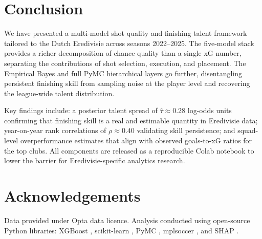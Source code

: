 \documentclass[12pt,a4paper]{article}
\begin{document}
\section{Conclusion}
\label{sec:conclusion}

We have presented a multi-model shot quality and finishing talent framework tailored to the Dutch Eredivisie across seasons 2022--2025. The five-model stack provides a richer decomposition of chance quality than a single xG number, separating the contributions of shot selection, execution, and placement. The Empirical Bayes and full PyMC hierarchical layers go further, disentangling persistent finishing skill from sampling noise at the player level and recovering the league-wide talent distribution.

Key findings include: a posterior talent spread of $\hat{\tau} \approx 0.28$ log-odds units confirming that finishing skill is a real and estimable quantity in Eredivisie data; year-on-year rank correlations of $\rho \approx 0.40$ validating skill persistence; and squad-level overperformance estimates that align with observed goals-to-xG ratios for the top clubs. All components are released as a reproducible Colab notebook to lower the barrier for Eredivisie-specific analytics research.

\section*{Acknowledgements}

Data provided under Opta data licence. Analysis conducted using open-source Python libraries: XGBoost \citep{chen2016xgboost}, scikit-learn \citep{pedregosa2011}, PyMC \citep{pymc2023}, mplsoccer \citep{mplsoccer}, and SHAP \citep{lundberg2017}.
\end{document}
